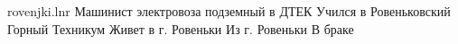  
 
 
 
 

\par
rovenjki.lnr
Машинист электровоза подземный в ДТЕК
Учился в Ровеньковский Горный Техникум
Живет в г. Ровеньки
Из г. Ровеньки
В браке

